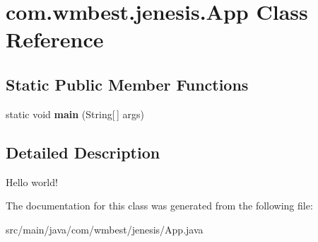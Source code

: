 \hypertarget{classcom_1_1wmbest_1_1jenesis_1_1App}{\section{com.\-wmbest.\-jenesis.\-App Class Reference}
\label{classcom_1_1wmbest_1_1jenesis_1_1App}
}
\subsection*{Static Public Member Functions}
\begin{DoxyCompactItemize}
\item 
\hypertarget{classcom_1_1wmbest_1_1jenesis_1_1App_a7b524b47846aa794502fb85fe0b7fb1d}{static void {\bfseries main} (String\mbox{[}$\,$\mbox{]} args)}\label{classcom_1_1wmbest_1_1jenesis_1_1App_a7b524b47846aa794502fb85fe0b7fb1d}

\end{DoxyCompactItemize}


\subsection{Detailed Description}
Hello world! 

The documentation for this class was generated from the following file\-:\begin{DoxyCompactItemize}
\item 
src/main/java/com/wmbest/jenesis/App.\-java\end{DoxyCompactItemize}
